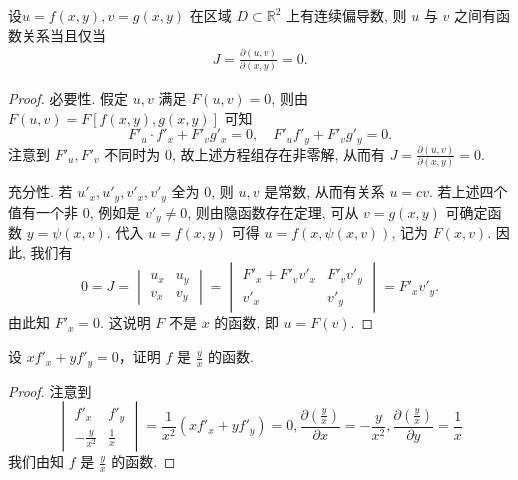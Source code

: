 \documentclass[../../main.tex]{subfiles}%
\begin{document}
\begin{theorem}\label{theorem:定理雅克比行列式为0的充要条件}
设\( u = f(x, y), v = g(x, y) \) 在区域 \( D \subset \mathbb{R}^2 \) 上有连续偏导数, 则 \( u \) 与 \( v \) 之间有函数关系当且仅当
\begin{align*}
J = \frac{\partial (u, v)}{\partial (x, y)} = 0.
\end{align*}
\end{theorem}
\begin{proof}

必要性. 假定 \( u, v \) 满足 \( F(u, v) = 0 \), 则由 \( F(u, v) = F[f(x, y), g(x, y)] \) 可知
\[
F'_u \cdot f'_x + F'_v g'_x = 0, \quad F'_u f'_y + F'_v g'_y = 0.
\]
注意到 \( F'_u, F'_v \) 不同时为 0, 故上述方程组存在非零解, 从而有 \( J = \frac{\partial (u, v)}{\partial (x, y)} = 0 \).

充分性. 若 \( u'_x, u'_y, v'_x, v'_y \) 全为 0, 则 \( u, v \) 是常数, 从而有关系 \( u = cv \). 若上述四个值有一个非 0, 例如是 \( v'_y \neq 0 \), 则由隐函数存在定理, 可从 \( v = g(x, y) \) 可确定函数 \( y = \psi(x, v) \). 代入 \( u = f(x, y) \) 可得 \( u = f(x, \psi(x, v)) \), 记为 \( F(x, v) \).
因此, 我们有
\[
0 = J = \begin{vmatrix}
u_x & u_y \\
v_x & v_y
\end{vmatrix} = \begin{vmatrix}
F'_x + F'_v v'_x & F'_v v'_y \\
v'_x & v'_y
\end{vmatrix} = F'_x v'_y.
\]
由此知 \( F'_x = 0 \). 这说明 \( F \) 不是 \( x \) 的函数, 即 \( u = F(v) \).

\end{proof}

\begin{example}
设 \( x f'_x + y f'_y = 0 \)，证明 \( f \) 是 \( \frac{y}{x} \) 的函数.
\end{example}
\begin{proof}

注意到
\[
\begin{vmatrix}
f'_x & f'_y \\
-\frac{y}{x^2} & \frac{1}{x}
\end{vmatrix} = \frac{1}{x^2} \left( x f'_x + y f'_y \right) = 0, \frac{\partial \left( \frac{y}{x} \right)}{\partial x} = -\frac{y}{x^2}, \frac{\partial \left( \frac{y}{x} \right)}{\partial y} = \frac{1}{x}
\]
我们由知 \( f \) 是 \( \frac{y}{x} \) 的函数.

\end{proof}
\end{document}
